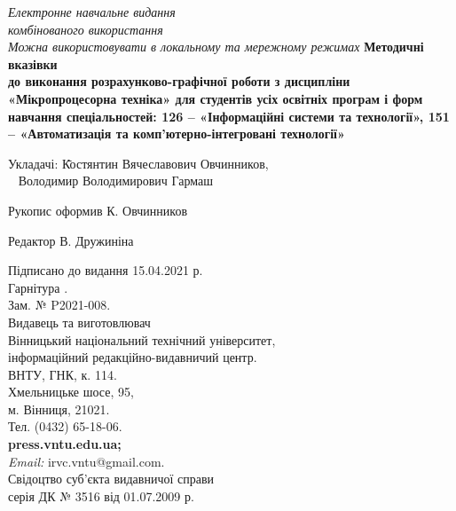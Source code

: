 \newpage
\thispagestyle{empty}
\onespace
\begin{center}
\textit{Електронне навчальне видання\\
комбінованого використання\\
Можна використовувати в локальному та мережному режимах}
\vfill
\large{\textbf{Методичні вказівки\\ до виконання розрахунково-графічної роботи з дисципліни «Мікропроцесорна техніка» для студентів усіх освітніх програм і форм навчання спеціальностей: 126 -- «Інформаційні системи та технології», 151 -- «Автоматизація та комп’ютерно-інтегровані технології»}}
\end{center}

\begin{tabbing}
\noindent Укладачі: \= Костянтин Вячеславович Овчинников,\\
~ \> Володимир Володимирович Гармаш
\end{tabbing}

\noindent Рукопис оформив К. Овчинников

\vspace{0.4cm}
\noindent Редактор В. Дружиніна

\vfill
\vfill

\begin{center}
\small{
Підписано до видання 15.04.2021 р.\\
Гарнітура \garnitura.\\
Зам. № P2021-008.\\
\vfill
\vfill
Видавець та виготовлювач\\
Вінницький національний технічний університет,\\
інформаційний редакційно-видавничий центр.\\
ВНТУ, ГНК, к. 114.\\
Хмельницьке шосе, 95,\\
м. Вінниця, 21021.\\
Тел. (0432) 65-18-06.\\
\textbf{press.vntu.edu.ua;}\\
\textit{Email:} irvc.vntu@gmail.com.\\
Свідоцтво суб’єкта видавничої справи\\
серія ДК № 3516 від 01.07.2009 р.}
\vfill
\vfill
\vfill

\end{center}
